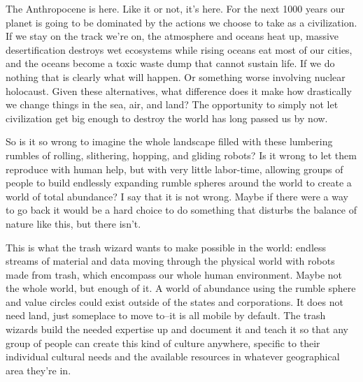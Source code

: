 \documentclass[11pt]{article}
\begin{document}
The Anthropocene is here. Like it or not, it's here. For the next 1000
years our planet is going to be dominated by the actions we choose to
take as a civilization. If we stay on the track we're on, the atmosphere
and oceans heat up, massive desertification destroys wet ecosystems
while rising oceans eat most of our cities, and the oceans become a
toxic waste dump that cannot sustain life. If we do nothing that is
clearly what will happen. Or something worse involving nuclear
holocaust. Given these alternatives, what difference does it make how
drastically we change things in the sea, air, and land? The opportunity
to simply not let civilization get big enough to destroy the world has
long passed us by now.

So is it so wrong to imagine the whole landscape filled with these
lumbering rumbles of rolling, slithering, hopping, and gliding robots?
Is it wrong to let them reproduce with human help, but with very little
labor-time, allowing groups of people to build endlessly expanding
rumble spheres around the world to create a world of total abundance? I
say that it is not wrong. Maybe if there were a way to go back it would
be a hard choice to do something that disturbs the balance of nature
like this, but there isn't.

This is what the trash wizard wants to make possible in the world:
endless streams of material and data moving through the physical world
with robots made from trash, which encompass our whole human
environment. Maybe not the whole world, but enough of it. A world of
abundance using the rumble sphere and value circles could exist outside
of the states and corporations. It does not need land, just someplace to
move to--it is all mobile by default. The trash wizards build the needed
expertise up and document it and teach it so that any group of people
can create this kind of culture anywhere, specific to their individual
cultural needs and the available resources in whatever geographical area
they're in.
\end{document}
